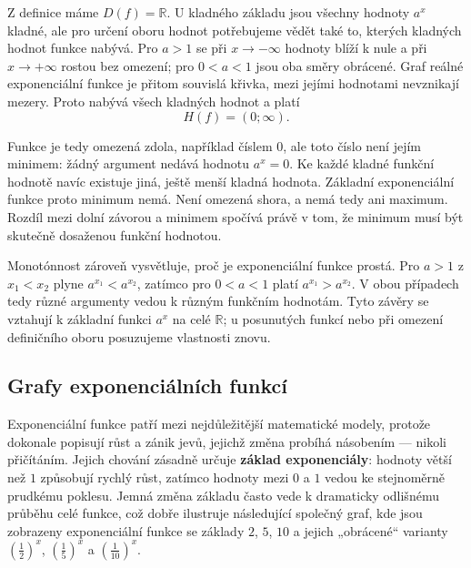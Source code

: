 \documentclass[12pt,a4paper]{article}
\begin{document}
Z definice máme $D(f)=\mathbb{R}$. U kladného základu jsou všechny hodnoty $a^x$ kladné,
ale pro určení oboru hodnot potřebujeme vědět také to, kterých kladných hodnot funkce nabývá.
Pro $a>1$ se při $x\to-\infty$ hodnoty blíží k nule a při $x\to+\infty$ rostou bez omezení;
pro $0<a<1$ jsou oba směry obrácené.
Graf reálné exponenciální funkce je přitom souvislá křivka, mezi jejími hodnotami nevznikají mezery.
Proto nabývá všech kladných hodnot a platí
\[
    H(f)=(0;\infty).
\]

Funkce je tedy omezená zdola, například číslem $0$, ale toto číslo není jejím minimem:
žádný argument nedává hodnotu $a^x=0$.
Ke každé kladné funkční hodnotě navíc existuje jiná, ještě menší kladná hodnota.
Základní exponenciální funkce proto minimum nemá. Není omezená shora, a nemá tedy ani maximum.
Rozdíl mezi dolní závorou a minimem spočívá právě v tom, že minimum musí být skutečně dosaženou funkční hodnotou.

Monotónnost zároveň vysvětluje, proč je exponenciální funkce prostá.
Pro $a>1$ z $x_1<x_2$ plyne $a^{x_1}<a^{x_2}$, zatímco pro $0<a<1$ platí $a^{x_1}>a^{x_2}$.
V obou případech tedy různé argumenty vedou k různým funkčním hodnotám.
Tyto závěry se vztahují k základní funkci $a^x$ na celé $\mathbb{R}$;
u posunutých funkcí nebo při omezení definičního oboru posuzujeme vlastnosti znovu.

\subsection*{Grafy exponenciálních funkcí}
Exponenciální funkce patří mezi nejdůležitější matematické modely, protože
dokonale popisují růst a zánik jevů, jejichž změna probíhá násobením
— nikoli přičítáním. Jejich chování zásadně určuje \textbf{základ exponenciály}:
hodnoty větší než $1$ způsobují rychlý růst, zatímco hodnoty mezi $0$ a $1$
vedou ke stejnoměrně prudkému poklesu. Jemná změna základu často vede k dramaticky
odlišnému průběhu celé funkce, což dobře ilustruje následující společný graf,
kde jsou zobrazeny exponenciální funkce se základy $2$, $5$, $10$ a jejich
„obrácené“ varianty $\left(\frac12\right)^x$, $\left(\frac15\right)^x$ a
$\left(\frac{1}{10}\right)^x$.
\end{document}

